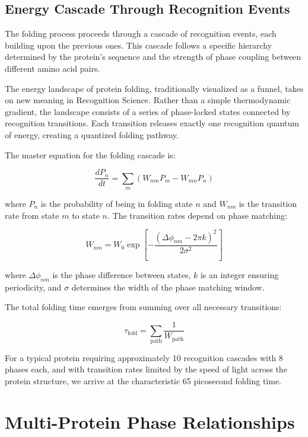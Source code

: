 \documentclass[12pt,a4paper]{report}
\begin{document}
\subsection{Energy Cascade Through Recognition Events}

The folding process proceeds through a cascade of recognition events, each building upon the previous ones. This cascade follows a specific hierarchy determined by the protein's sequence and the strength of phase coupling between different amino acid pairs.

The energy landscape of protein folding, traditionally visualized as a funnel, takes on new meaning in Recognition Science. Rather than a simple thermodynamic gradient, the landscape consists of a series of phase-locked states connected by recognition transitions. Each transition releases exactly one recognition quantum of energy, creating a quantized folding pathway.

The master equation for the folding cascade is:

\begin{equation}
\frac{dP_n}{dt} = \sum_m (W_{nm} P_m - W_{mn} P_n)
\end{equation}

where $P_n$ is the probability of being in folding state $n$ and $W_{nm}$ is the transition rate from state $m$ to state $n$. The transition rates depend on phase matching:

\begin{equation}
W_{nm} = W_0 \exp\left[-\frac{(\Delta\phi_{nm} - 2\pi k)^2}{2\sigma^2}\right]
\end{equation}

where $\Delta\phi_{nm}$ is the phase difference between states, $k$ is an integer ensuring periodicity, and $\sigma$ determines the width of the phase matching window.

The total folding time emerges from summing over all necessary transitions:

\begin{equation}
\tau_{\text{fold}} = \sum_{\text{path}} \frac{1}{W_{\text{path}}}
\end{equation}

For a typical protein requiring approximately 10 recognition cascades with 8 phases each, and with transition rates limited by the speed of light across the protein structure, we arrive at the characteristic 65 picosecond folding time.

\section{Multi-Protein Phase Relationships}
\end{document}
